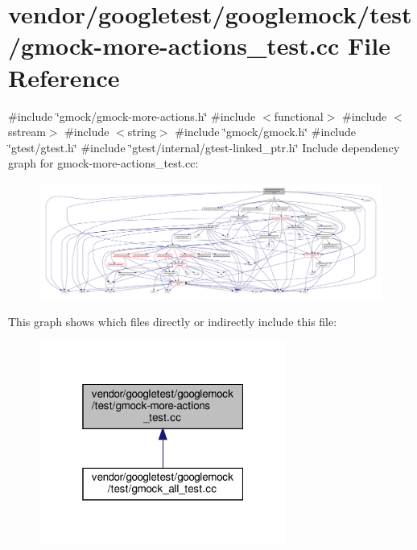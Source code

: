 \hypertarget{gmock-more-actions__test_8cc}{}\section{vendor/googletest/googlemock/test/gmock-\/more-\/actions\+\_\+test.cc File Reference}
\label{gmock-more-actions__test_8cc}
{\ttfamily \#include \char`\"{}gmock/gmock-\/more-\/actions.\+h\char`\"{}}\newline
{\ttfamily \#include $<$functional$>$}\newline
{\ttfamily \#include $<$sstream$>$}\newline
{\ttfamily \#include $<$string$>$}\newline
{\ttfamily \#include \char`\"{}gmock/gmock.\+h\char`\"{}}\newline
{\ttfamily \#include \char`\"{}gtest/gtest.\+h\char`\"{}}\newline
{\ttfamily \#include \char`\"{}gtest/internal/gtest-\/linked\+\_\+ptr.\+h\char`\"{}}\newline
Include dependency graph for gmock-\/more-\/actions\+\_\+test.cc\+:
\nopagebreak
\begin{figure}[H]
\begin{center}
\leavevmode
\includegraphics[width=350pt]{gmock-more-actions__test_8cc__incl}
\end{center}
\end{figure}
This graph shows which files directly or indirectly include this file\+:
\nopagebreak
\begin{figure}[H]
\begin{center}
\leavevmode
\includegraphics[width=229pt]{gmock-more-actions__test_8cc__dep__incl}
\end{center}
\end{figure}
